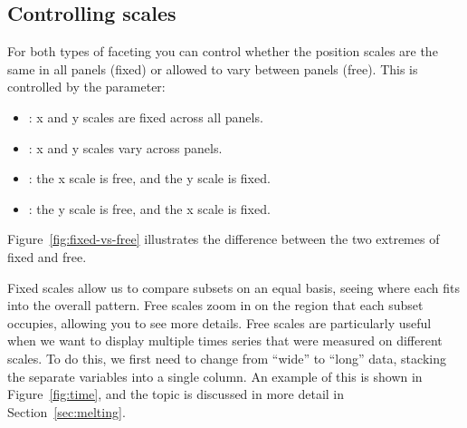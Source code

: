 \subsection{Controlling scales}
\label{sub:controlling_scales}

For both types of faceting you can control whether the position scales are the same in all panels (fixed) or allowed to vary between panels (free).  This is controlled by the  parameter:

\begin{itemize}
  \item {}: x and y scales are fixed across all panels.
  \item {}: x and y scales vary across panels.
  \item {}: the x scale is free, and the y scale is fixed.
  \item {}: the y scale is free, and the x scale is fixed.
\end{itemize}

\noindent Figure~\ref{fig:fixed-vs-free} illustrates the difference between the two extremes of fixed and free.

% 

Fixed scales allow us to compare subsets on an equal basis, seeing where each fits into the overall pattern.  Free scales zoom in on the region that each subset occupies, allowing you to see more details. Free scales are particularly useful when we want to display multiple times series that were measured on different scales.  To do this, we first need to change from ``wide'' to ``long'' data, stacking the separate variables into a single column.  An example of this is shown in Figure~\ref{fig:time}, and the topic is discussed in more detail in Section~\ref{sec:melting}.  

% 



